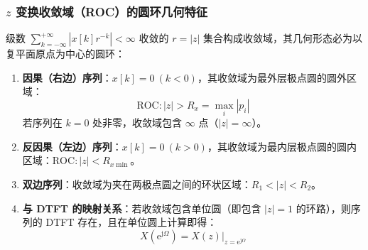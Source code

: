 \documentclass[11pt,a4paper,fontset=fandol]{ctexart}
\theoremstyle{remark}
\begin{document}
\subsubsection{$z$ 变换收敛域（ROC）的圆环几何特征}
级数 $\sum_{k=-\infty}^{+\infty} |x[k] r^{-k}| < \infty$ 收敛的 $r = |z|$ 集合构成收敛域，其几何形态必为以复平面原点为中心的圆环：
\begin{enumerate}
    \item \textbf{因果（右边）序列}：$x[k] = 0 \ (k < 0)$，其收敛域为最外层极点圆的圆外区域：
    \begin{equation}
        \mathrm{ROC}: |z| > R_x = \max_{i} |p_i|
    \end{equation}
    若序列在 $k=0$ 处非零，收敛域包含 $\infty$ 点（$|z| = \infty$）。
    \item \textbf{反因果（左边）序列}：$x[k] = 0 \ (k > 0)$，其收敛域为最内层极点圆的圆内区域：$\mathrm{ROC}: |z| < R_{x\min}$。
    \item \textbf{双边序列}：收敛域为夹在两极点圆之间的环状区域：$R_1 < |z| < R_2$。
    \item \textbf{与 DTFT 的映射关系}：若收敛域包含单位圆（即包含 $|z| = 1$ 的环路），则序列的 DTFT 存在，且在单位圆上计算即得：
    \begin{equation}
        X(\mathrm{e}^{\mathrm{j}\Omega}) = \left. X(z) \right|_{z = \mathrm{e}^{\mathrm{j}\Omega}}
    \end{equation}
\end{enumerate}
\end{document}
